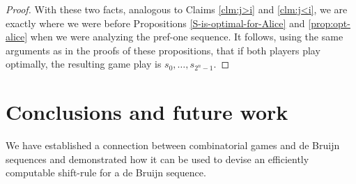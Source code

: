 \documentclass[final,12pt]{elsarticle}
\theoremstyle{definition} \newtheorem{definition}[theorem]{Definition} \newtheorem{observation}[theorem]{Observation} \newtheorem{example}[theorem]{Example} \newtheorem{remark}[theorem]{Remark} \newtheorem{corrolary}[theorem]{Corrolary}
\newcommand{\T}[1]{\langle{#1}\rangle}
\newcommand\game[2]{ \foreach \b [count=\s] in #1 { \node[draw, circle,fill=color\b!50!yellow,inner sep=1pt] at ({360/\n * (\s - 1)}:\radius) {$\b$}; \draw[<-, >=latex] ({360/\n * (\s-1)+\margin}:\radius) arc ({360/\n * (\s - 1)+\margin}:{360/\n * (\s)-\margin}:\radius); } \draw[vecArrow,fill=gray] (0,0) to (360/\n * #2:\radius*.8); \node[draw, circle, fill=yellow!30!gray] at (0,0) {}; }
\begin{document}
\begin{proof}
	With these two facts, analogous to Claims \ref{clm:j>i} and \ref{clm:j<i}, we are exactly where we were before Propositions \ref{S-is-optimal-for-Alice} and \ref{prop:opt-alice} when we were analyzing the pref-one sequence. It follows, using the same arguments as in the proofs of these propositions, that if both players play optimally, the resulting game play is $s_0,\dots,s_{2^n-1}$.
\end{proof}

%
%	
%		
%			
%			
%			
%			
%			
%		


\section{Conclusions and future work}
We have established a connection between combinatorial games and de Bruijn sequences and demonstrated how it can be used to devise an efficiently computable shift-rule for a de Bruijn sequence.
\end{document}
